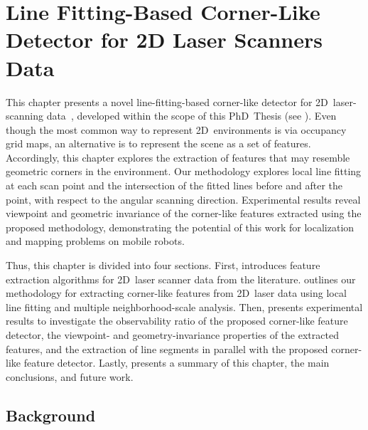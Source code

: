 \chapter{Line Fitting-Based Corner-Like Detector for 2D Laser Scanners Data}\label{chap:features}

This chapter presents a novel line-fitting-based corner-like detector for
2D~laser-scanning data~\cite{sousa:icara:2024},
developed within the scope of this PhD~Thesis (see ).
Even though the most common way to represent 2D~environments is via
occupancy grid maps, an alternative is to represent the scene
as a set of features. Accordingly, this chapter explores
the extraction of features that may resemble geometric corners
in the environment. Our methodology explores local line fitting
at each scan point and the intersection of the fitted lines
before and after the point, with respect to the angular scanning direction.
Experimental results reveal viewpoint and geometric invariance of
the corner-like features extracted using the proposed methodology,
demonstrating the potential of this work for
localization and mapping problems on mobile robots.

Thus, this chapter is divided into four sections.
First,  introduces feature extraction algorithms
for 2D~laser scanner data from the literature.
 outlines our methodology for extracting
corner-like features from 2D~laser data using local line fitting
and multiple neighborhood-scale analysis.
Then,  presents experimental results to investigate
the observability ratio of the proposed corner-like feature detector,
the viewpoint- and geometry-invariance properties of the extracted features,
and the extraction of line segments in parallel with
the proposed corner-like feature detector.
Lastly,  presents a summary of this chapter,
the main conclusions, and future work.

\section{Background}\label{sec:features:background}

